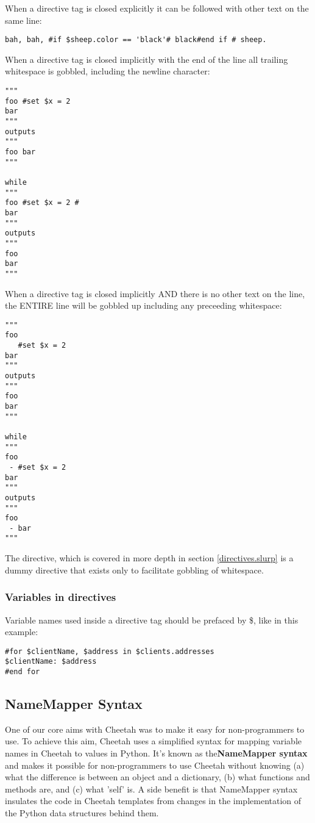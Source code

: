 When a directive tag is closed explicitly it can be followed with other text on
the same line:

\begin{verbatim}
bah, bah, #if $sheep.color == 'black'# black#end if # sheep.
\end{verbatim}

When a directive tag is closed implicitly with the end of the line all trailing
whitespace is gobbled, including the newline character:
\begin{verbatim}
"""
foo #set $x = 2 
bar
"""
outputs 
"""
foo bar
"""

while 
"""
foo #set $x = 2 #
bar
"""
outputs 
"""
foo 
bar
"""
\end{verbatim}

When a directive tag is closed implicitly AND there is no other text on the
line, the ENTIRE line will be gobbled up including any preceeding whitespace:
\begin{verbatim}
"""
foo 
   #set $x = 2 
bar
"""
outputs 
"""
foo
bar
"""

while 
"""
foo 
 - #set $x = 2
bar
"""
outputs 
"""
foo 
 - bar
"""
\end{verbatim}

The  directive, which is covered in more depth in section
\ref{directives.slurp} is a dummy directive that exists only to facilitate
gobbling of whitespace.

\subsubsection{Variables in directives}
\label{language.directives.variables}

Variable names used inside a directive tag should be prefaced by \$, like in this
example:

\begin{verbatim}
#for $clientName, $address in $clients.addresses
$clientName: $address
#end for
\end{verbatim}


\subsection{NameMapper Syntax}
\label{language.namemapper}

One of our core aims with Cheetah was to make it easy for non-programmers to
use. To achieve this aim, Cheetah uses a simplified syntax for mapping variable
names in Cheetah to values in Python. It's known as the{\bf NameMapper syntax}
and makes it possible for non-programmers to use Cheetah without knowing (a)
what the difference is between an object and a dictionary, (b) what functions
and methods are, and (c) what 'self' is. A side benefit is that NameMapper
syntax insulates the code in Cheetah templates from changes in the implementation
of the Python data structures behind them.

